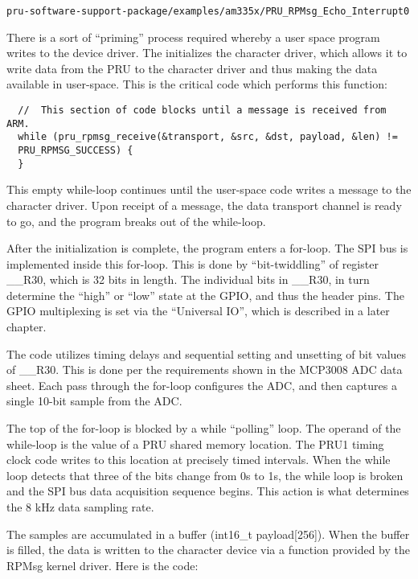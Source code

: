 \begin{verbatim}
pru-software-support-package/examples/am335x/PRU_RPMsg_Echo_Interrupt0
\end{verbatim}

There is a sort of ``priming'' process required whereby a user space program writes
to the device driver.  The initializes the character driver, which allows it to write data from
the PRU to the character driver and thus making the data available in user-space.  This is the critical
code which performs this function:

\begin{verbatim}
  //  This section of code blocks until a message is received from ARM.
  while (pru_rpmsg_receive(&transport, &src, &dst, payload, &len) !=
  PRU_RPMSG_SUCCESS) {
  }
\end{verbatim}

This empty while-loop continues until the user-space code writes a message to the character driver.  Upon receipt of a message, the data transport channel is ready to go, and the program breaks out of the while-loop.

After the initialization is complete, the program enters a for-loop.  The SPI bus is implemented inside this for-loop.  This is done by ``bit-twiddling'' of register \_\_R30, which is 32 bits in length.  The individual bits in \_\_R30, in turn determine the ``high'' or ``low'' state at the GPIO, and thus the header pins.  The GPIO multiplexing is set via the ``Universal IO'', which is described in a later chapter.

The code utilizes timing delays and sequential setting and unsetting of bit values of \_\_R30.  This is done per the requirements shown in the MCP3008 ADC data sheet. Each pass through the for-loop configures the ADC, and then captures a single 10-bit sample from the ADC.

The top of the for-loop is blocked by a while ``polling'' loop.  The operand of the while-loop is the value of a PRU shared memory location.  The PRU1 timing clock code writes to this location at precisely timed intervals.  When the while loop detects that three of the bits change from 0s to 1s, the while loop is broken and the SPI bus data acquisition sequence begins.  This action is what determines the 8 kHz data sampling rate.

The samples are accumulated in a buffer (int16\_t payload[256]).  When the buffer is filled, the data is written to the character device via a function provided by the RPMsg kernel driver.  Here is the code:

